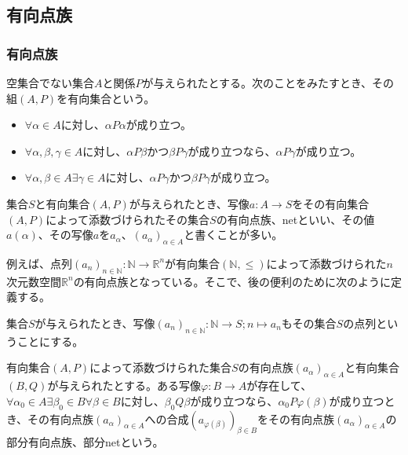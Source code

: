 \documentclass[dvipdfmx]{jsarticle}
\begin{document}
\subsection{有向点族}%
\subsubsection{有向点族}%
\begin{dfn}
空集合でない集合$A$と関係$P$が与えられたとする。次のことをみたすとき、その組$(A,P)$を有向集合という。
\begin{itemize}
\item
  $\forall\alpha \in A$に対し、$\alpha P\alpha$が成り立つ。
\item
  $\forall\alpha,\beta,\gamma \in A$に対し、$\alpha P\beta$かつ$\beta P\gamma$が成り立つなら、$\alpha P\gamma$が成り立つ。
\item
  $\forall\alpha,\beta \in A\exists\gamma \in A$に対し、$\alpha P\gamma$かつ$\beta P\gamma$が成り立つ。
\end{itemize}
\end{dfn}
\begin{dfn}
集合$S$と有向集合$(A,P)$が与えられたとき、写像$a:A \rightarrow S$をその有向集合$(A,P)$によって添数づけられたその集合$S$の有向点族、netといい、その値$a(\alpha)$、その写像$a$を$a_{\alpha}$、$\left( a_{\alpha} \right)_{\alpha \in A}$と書くことが多い。
\end{dfn}\par
例えば、点列$\left( a_{n} \right)_{n \in \mathbb{N}}:\mathbb{N} \rightarrow \mathbb{R}^{n}$が有向集合$\left( \mathbb{N}, \leq \right)$によって添数づけられた$n$次元数空間$\mathbb{R}^{n}$の有向点族となっている。そこで、後の便利のために次のように定義する。
\begin{dfn}
集合$S$が与えられたとき、写像$\left( a_{n} \right)_{n \in \mathbb{N}}:\mathbb{N} \rightarrow S;n \mapsto a_{n}$もその集合$S$の点列ということにする。
\end{dfn}
\begin{dfn}
有向集合$(A,P)$によって添数づけられた集合$S$の有向点族$\left( a_{\alpha} \right)_{\alpha \in A}$と有向集合$(B,Q)$が与えられたとする。ある写像$\varphi:B \rightarrow A$が存在して、$\forall\alpha_{0} \in A\exists\beta_{0} \in B\forall\beta \in B$に対し、$\beta_{0}Q\beta$が成り立つなら、$\alpha_{0}P\varphi(\beta)$が成り立つとき、その有向点族$\left( a_{\alpha} \right)_{\alpha \in A}$への合成$\left( a_{\varphi(\beta)} \right)_{\beta \in B}$をその有向点族$\left( a_{\alpha} \right)_{\alpha \in A}$の部分有向点族、部分netという。
\end{dfn}\par
\end{document}
